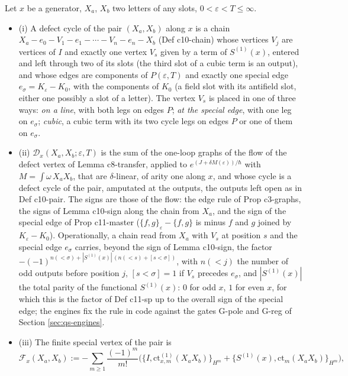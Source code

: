 \begin{definition}
\label{def:qs-defect}
Let $x$ be a generator, $X_a$, $X_b$ two letters of any slots, $0<\varepsilon<T\le\infty$.
\begin{itemize}
\item (i) A defect cycle of the pair $(X_a,X_b)$ along $x$ is a chain $X_a-e_0-V_1-e_1-\cdots-V_n-e_n-X_b$ (Def c10-chain) whose vertices $V_j$ are vertices of $I$ and exactly one vertex $V_s$ given by a term of $S^{(1)}(x)$, entered and left through two of its slots (the third slot of a cubic term is an output), and whose edges are components of $P(\varepsilon,T)$ and exactly one special edge $e_\sigma=K_\varepsilon-K_0$, with the components of $K_0$ (a field slot with its antifield slot, either one possibly a slot of a letter). The vertex $V_s$ is placed in one of three ways: \emph{on a line}, with both legs on edges $P$; \emph{at the special edge}, with one leg on $e_\sigma$; \emph{cubic}, a cubic term with its two cycle legs on edges $P$ or one of them on $e_\sigma$.
\item (ii) $\mathcal D_x(X_a,X_b;\varepsilon,T)$ is the sum of the one-loop graphs of the flow of the defect vertex of Lemma c8-transfer, applied to $e^{(J+\delta M(\varepsilon))/\hbar}$ with $M=\int\omega\,X_aX_b$, that are $\delta$-linear, of arity one along $x$, and whose cycle is a defect cycle of the pair, amputated at the outputs, the outputs left open as in Def c10-pair. The signs are those of the flow: the edge rule of Prop c3-graphs, the signs of Lemma c10-sign along the chain from $X_a$, and the sign of the special edge of Prop c11-master ($\{f,g\}_\varepsilon-\{f,g\}$ is minus $f$ and $g$ joined by $K_\varepsilon-K_0$). Operationally, a chain read from $X_a$ with $V_s$ at position $s$ and the special edge $e_\sigma$ carries, beyond the sign of Lemma c10-sign, the factor $-(-1)^{n(<\sigma)+|S^{(1)}(x)|\,(n(<s)+[s<\sigma])}$, with $n(<j)$ the number of odd outputs before position $j$, $[s<\sigma]=1$ if $V_s$ precedes $e_\sigma$, and $|S^{(1)}(x)|$ the total parity of the functional $S^{(1)}(x)$: $0$ for odd $x$, $1$ for even $x$, for which this is the factor of Def c11-sp up to the overall sign of the special edge; the engines fix the rule in code against the gates G-pole and G-reg of Section \ref{sec:qs-engines}.
\item (iii) The finite special vertex of the pair is
\begin{equation}
\mathcal F_x(X_a,X_b):=-\sum_{m\ge1}\frac{(-1)^m}{m!}\Big(\big\{I,\mathrm{ct}^{(1)}_{x,m}(X_aX_b)\big\}_{H^m}+\big\{S^{(1)}(x),\mathrm{ct}_m(X_aX_b)\big\}_{H^m}\Big),

\end{equation}
\end{itemize}
\end{definition}
